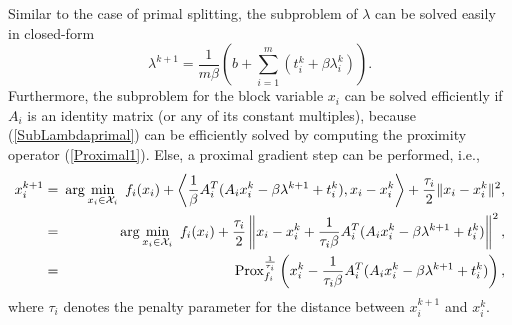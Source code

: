 \documentclass{mcom-l}
\theoremstyle{definition}
\theoremstyle{remark}
\numberwithin{equation}{section}
\begin{document}
{Similar to the case of primal splitting, the subproblem of $\lambda$ can be solved easily in closed-form
\begin{equation}\label{DualSuby}
\lambda^{k+1} = \frac{1}{m\beta}\left( b+ \sum_{i=1}^m (t_i^k + \beta \lambda_i^k) \right).
\end{equation}
Furthermore, the subproblem for the block variable $x_i$ can be solved efficiently if $A_i$ is an identity matrix (or any of its constant multiples), because (\ref{SubLambdaprimal}) can be efficiently solved by computing the proximity operator (\ref{Proximal1}). Else, a proximal gradient step can be performed, i.e.,
\begin{eqnarray}\label{xLinearAlg3}
x_i^{k+1} &=&\!\!\! \arg\min_{x_i\in {\mathcal{X}}_i}\ f_i(x_i) + \left\langle \frac{1}{\beta}A_i^T( A_i x_i^k - \beta \lambda^{k+1} + t_i^k),x_i - x_i^k \right\rangle + \frac{\tau_i}{2} \|x_i - x_i^k\|^2,\nonumber\\
&=&\!\!\! \arg\min_{x_i\in {\mathcal{X}}_i}\ f_i(x_i) + \frac{\tau_i}{2} \left\|x_i - x_i^k + \frac{1}{\tau_i\beta}A_i^T( A_i x_i^k - \beta \lambda^{k+1} + t_i^k)\right\|^2,\nonumber\\
&=&\!\!\! \hbox{Prox}_{f_i}^{\frac{1}{\tau_i}} \left(x_i^k - \frac{1}{\tau_i\beta}A_i^T( A_i x_i^k - \beta \lambda^{k+1} + t_i^k)\right),
\end{eqnarray}
where $\tau_i$ denotes the penalty parameter for the distance between $x_i^{k+1}$ and $x_i^k$.

}
\end{document}
